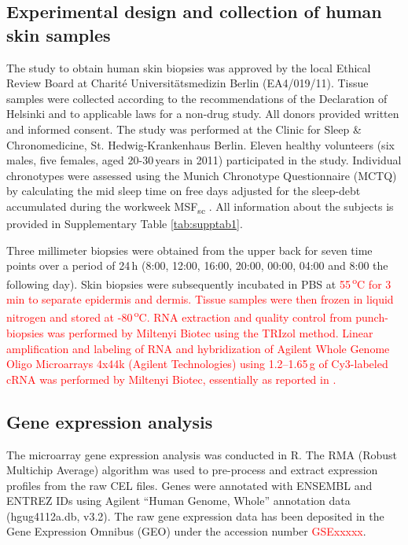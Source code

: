 \subsection*{Experimental design and collection of human skin samples}
The study to obtain human skin biopsies was approved by the local Ethical Review Board at Charit\'e Universit\"atsmedizin Berlin (EA4/019/11). Tissue samples were collected according to the recommendations of the Declaration of Helsinki and to applicable laws for a non-drug study. All donors provided written and informed consent. The study was performed at the Clinic for Sleep \& Chronomedicine, St. Hedwig-Krankenhaus Berlin. Eleven healthy volunteers (six males, five females, aged 20-30\,years in 2011) participated in the study. Individual chronotypes were assessed using the Munich Chronotype Questionnaire (MCTQ) by calculating the mid sleep time on free days adjusted for the sleep-debt accumulated during the workweek MSF\textsubscript{sc} \cite{Vetter2021}. All information about the subjects is provided in Supplementary Table \ref{tab:supptab1}.  %

Three millimeter biopsies were obtained from the upper back for seven time points over a period of 24\,h (8:00, 12:00, 16:00, 20:00, 00:00, 04:00 and 8:00 the following day). Skin biopsies were subsequently incubated in PBS at \textcolor{red}{55\,\textsuperscript{o}C for 3\,min to separate epidermis and dermis. Tissue samples were then frozen in liquid nitrogen and stored at -80\,\textsuperscript{o}C. RNA extraction and quality control from punch-biopsies was performed by Miltenyi Biotec using the TRIzol method. Linear amplification and labeling of RNA and hybridization of Agilent Whole Genome Oligo Microarrays 4x44k (Agilent Technologies) using 1.2--1.65\,\textmu g of Cy3-labeled cRNA was performed by Miltenyi Biotec, essentially as reported in \cite{Duggan1999}.}  

\subsection*{Gene expression analysis}
The microarray gene expression analysis was conducted in R. The RMA (Robust Multichip Average) algorithm was used to pre-process and extract expression profiles from the raw CEL files. Genes were annotated with ENSEMBL and ENTREZ IDs using Agilent ``Human Genome, Whole'' annotation data (hgug4112a.db, v3.2). The raw gene expression data has been deposited in the Gene Expression Omnibus (GEO) under the accession number \textcolor{red}{GSExxxxx}. 

